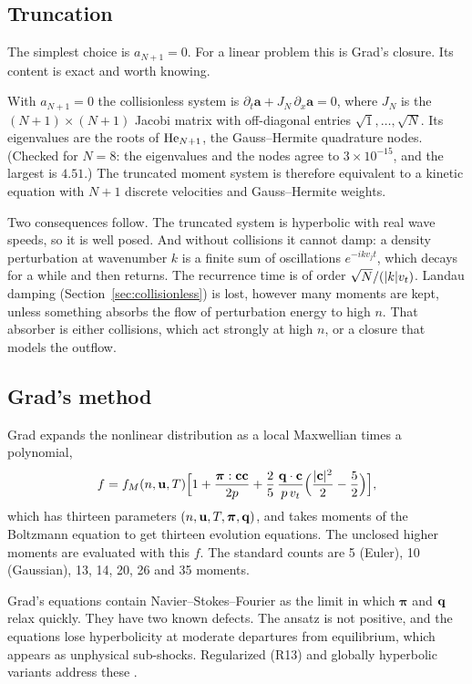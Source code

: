 \subsection{Truncation}

The simplest choice is $a_{N+1}=0$. For a linear problem this is Grad's
closure. Its content is exact and worth knowing.

\begin{example}
With $a_{N+1}=0$ the collisionless system is
$\partial_t\mathbf a+J_N\,\partial_x\mathbf a=0$, where $J_N$ is the
$(N+1)\times(N+1)$ Jacobi matrix with off-diagonal entries
$\sqrt1,\dots,\sqrt N$. Its eigenvalues are the roots of $\mathrm{He}_{N+1}$, the
Gauss--Hermite quadrature nodes. (Checked for $N=8$: the eigenvalues and
the nodes agree to $3\times10^{-15}$, and the largest is $4.51$.) The
truncated moment system is therefore equivalent to a kinetic equation with
$N+1$ discrete velocities and Gauss--Hermite weights.
\end{example}

Two consequences follow. The truncated system is hyperbolic with real wave
speeds, so it is well posed. And without collisions it cannot damp: a
density perturbation at wavenumber $k$ is a finite sum of oscillations
$e^{-ikv_jt}$, which decays for a while and then returns. The recurrence
time is of order $\sqrt N/(|k|v_t)$. Landau damping
(Section~\ref{sec:collisionless}) is lost, however many moments are kept,
unless something absorbs the flow of perturbation energy to high $n$. That
absorber is either collisions, which act strongly at high $n$, or a
closure that models the outflow.

\subsection{Grad's method}

Grad \cite{Grad49} expands the nonlinear distribution as a local Maxwellian
times a polynomial,
\[
  f=f_M(n,\mathbf{u},T)\Bigl[1+\frac{\boldsymbol\pi:\mathbf{c}\mathbf{c}}{2p}
     +\frac{2}{5}\,\frac{\mathbf{q}\cdot\mathbf{c}}{p\,v_t}
       \Bigl(\frac{|\mathbf{c}|^2}{2}-\frac52\Bigr)\Bigr],
\]
which has thirteen parameters $(n,\mathbf{u},T,\boldsymbol\pi,\mathbf{q})$, and takes
moments of the Boltzmann equation to get thirteen evolution equations. The
unclosed higher moments are evaluated with this $f$. The standard counts
are 5 (Euler), 10 (Gaussian), 13, 14, 20, 26 and 35 moments.

Grad's equations contain Navier--Stokes--Fourier as the limit in which
$\boldsymbol\pi$ and $\mathbf{q}$ relax quickly. They have two known defects. The
ansatz is not positive, and the equations lose hyperbolicity at moderate
departures from equilibrium, which appears as unphysical sub-shocks.
Regularized (R13) and globally hyperbolic variants address these
\cite{StruchtrupTorrilhon03,Struchtrup05}.

